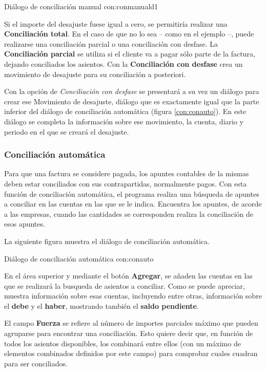 {Diálogo de conciliación manual}
{con:conmanuald1}

Si el importe del desajuste fuese igual a cero, se permitiría realizar una \textbf{Conciliación total}. En el caso de que no lo sea -- como en el ejemplo --, puede realizarse una conciliación parcial o una conciliación con desfase. La \textbf{Conciliación parcial} se utiliza si el cliente va a pagar sólo parte de la factura, dejando conciliados los asientos. Con la \textbf{Conciliación con desfase} crea un movimiento de desajuste para su conciliación a posteriori.

Con la opción de \emph{Conciliación con desfase} se presentará a su vez un diálogo para crear ese Movimiento de desajuste, diálogo que es exactamente igual que la parte inferior del diálogo de conciliación automática (figura \ref{con:conauto}). En este diálogo se completa la información sobre ese movimiento, la cuenta, diario y periodo en el que se creará el desajuste.


\subsubsection{Conciliación automática}
Para que una factura se considere pagada, los apuntes contables de la mismas deben estar conciliados con sus contrapartidas, normalmente pagos. Con esta función de conciliación automática, el programa realiza una búsqueda de apuntes a conciliar en las cuentas en las que se le indica. Encuentra los apuntes, de acorde a las empresas, cuando las cantidades se corresponden realiza la conciliación de esos apuntes. 

La siguiente figura muestra el diálogo de conciliación automática.

{Diálogo de conciliación automática}
{con:conauto}

En el área superior y mediante el botón \textbf{Agregar}, se añaden las cuentas en las que se realizará la busqueda de asientos a conciliar. Como se puede apreciar, muestra información sobre esas cuentas, incluyendo entre otras, información sobre el \textbf{debe} y el \textbf{haber}, mostrando también el \textbf{saldo pendiente}.

El campo \textbf{Fuerza} se refiere al número de importes parciales máximo que pueden agruparse para encontrar una conciliación. Esto quiere decir que, en función de todos los asientos disponibles, los combinará entre ellos (con un máximo de elementos combinados definidos por este campo) para comprobar cuales cuadran para ser conciliados.

